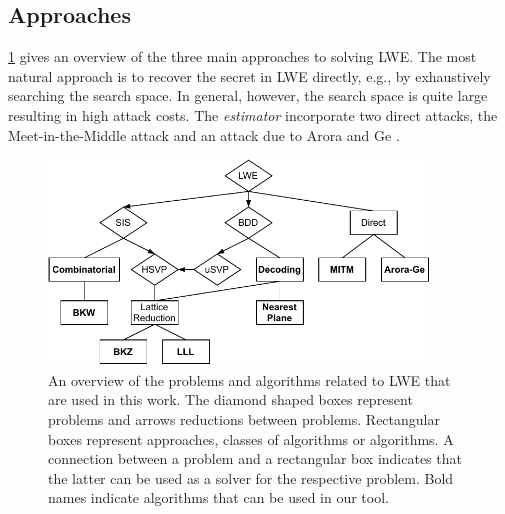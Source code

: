 \subsection{Approaches}
\cref{fig:algorithms} gives an overview of the three main approaches to solving LWE. The most natural approach is to recover the secret in LWE directly, e.g., by exhaustively searching the search space. In general, however, the search space is quite large resulting in high attack costs. The \textit{estimator} incorporate two direct attacks, the Meet-in-the-Middle attack \cite{BG14} and an attack due to Arora and Ge \cite{AG11}. %
\begin{figure}[h]
  \centering
  \includegraphics[width=0.9\textwidth]{graphics/algorithms_overview.pdf}
  \caption[An Overview of Algorithms and Related Problems for Solving LWE]{An overview of the problems and algorithms related to LWE that are used in this work. The diamond shaped boxes represent problems and arrows reductions between problems. Rectangular boxes represent approaches, classes of algorithms or algorithms. A connection between a problem and a rectangular box indicates that the latter can be used as a solver for the respective problem. Bold names indicate algorithms that can be used in our tool.}\label{fig:algorithms}
\end{figure}

